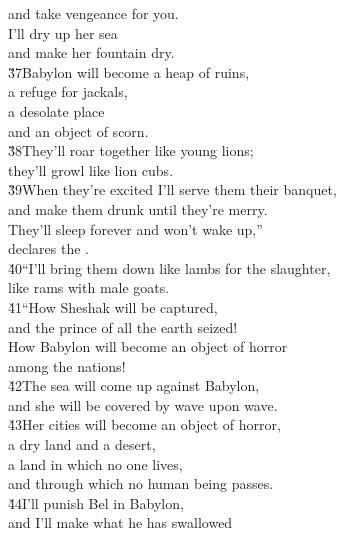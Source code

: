 \begin{poetry}
\poemll    and take vengeance for you. \\
\poeml I'll dry up her sea \\
\poemll    and make her fountain dry. \\
\poeml \v{37}Babylon will become a heap of ruins, \\
\poemll    a refuge for jackals, \\
\poeml a desolate place \\
\poemll    and an object of scorn. \\
\poeml \v{38}They'll roar together like young lions; \\
\poemll    they'll growl like lion cubs. \\
\poeml \v{39}When they're excited I'll serve them their banquet, \\
\poemll    and make them drunk until they're merry. \\
\poeml They'll sleep forever and won't wake up,'' \\
\poemll    declares the . \\
\poeml \v{40}``I'll bring them down like lambs for the slaughter, \\
\poemll    like rams with male goats. \\
\poeml \v{41}``How Sheshak will be captured, \\
\poemll    and the prince of all the earth seized! \\
\poeml How Babylon will become an object of horror \\
\poemll    among the nations! \\
\poeml \v{42}The sea will come up against Babylon, \\
\poemll    and she will be covered by wave upon wave. \\
\poeml \v{43}Her cities will become an object of horror, \\
\poemll    a dry land and a desert, \\
\poeml a land in which no one lives, \\
\poemll    and through which no human being passes. \\
\poeml \v{44}I'll punish Bel in Babylon, \\
\poemll    and I'll make what he has swallowed \\

\end{poetry}
